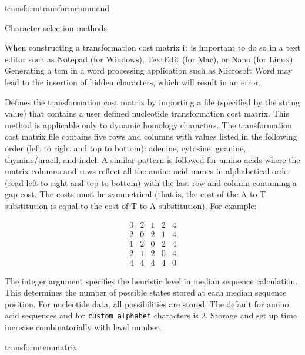 \begin{command}{transform}{transformcommand}
\begin{arguments}
\begin{argumentgroup}{Character selection methods}
            \begin{statement}
                When constructing a transformation cost matrix it is important to do so in a text editor 
                such as Notepad (for Windows), TextEdit (for Mac), or Nano (for Linux). Generating a tcm in 
                a word processing application such as Microsoft Word may lead to the insertion of hidden 
                characters, which will result in an error.
            \end{statement}

                {Defines the transformation cost matrix by importing a file (specified by
                the string value) that contains a user defined nucleotide
                transformation cost matrix. This method is applicable only to dynamic homology characters.
                The transformation cost matrix file contains five rows and columns
                with values listed in the following order (left to right and top to
                bottom): adenine, cytosine, guanine,
                thymine/uracil, and indel.  A similar pattern is followed for amino acids
                where the matrix columns and rows reflect all the amino acid names in alphabetical order
                (read left to right and top to bottom) with the last row and column containing a gap cost. 
                The costs must be symmetrical (that is, the
                cost of the A to T substitution is equal to the cost of T to A
                substitution). For example:

                \begin{equation*}
                    \begin{array}{lllll}
                        0 &     2 &    1 &     2 &     4 \\
                        2 &     0 &    2 &     1 &     4 \\
                        1 &     2 &    0 &     2 &     4 \\
                        2 &     1 &    2 &     0 &     4 \\
                        4 &     4 &    4 &     4 &     0
                     \end{array}
                \end{equation*} 

                The integer argument specifies the heuristic level in median sequence 
                calculation.  This determines the number of possible states stored at 
                each median sequence position.  For nucleotide data, all possibilities 
                are stored.  The default for amino acid sequences and for 
                \texttt{custom\_alphabet} characters is $2$.  Storage and set up time 
                increase combinatorially with level number.}
                {transformtcmmatrix}
     

\end{argumentgroup}
\end{arguments}
\end{command}
